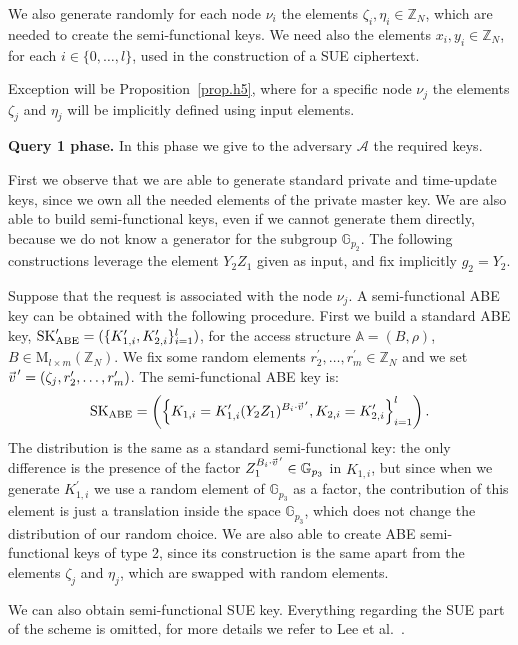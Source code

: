 \documentclass[a4paper,10pt]{article}
\newcommand{\G}{\mathbb{G}}
\newcommand{\Z}{\mathbb{Z}}
\newcommand{\varRow}{l}
\newcommand{\varColumn}{m}
\newcommand{\pvec}[2][]{{\hspace{-0.05em}\vec{\hspace{0.05em}#2}\mkern2mu\vphantom{#2}}^\prime_{\hspace{-0.18em}#1}}
\newcommand{\matrixset}[3]{\text{M}_{#1\times #2}(#3)}
\newcommand{\phase}[1]{\textbf{#1 phase.} \hspace{0pt}}
\begin{document}
	We also generate randomly for each node $\nu_i$ the elements $\zeta_i,\eta_i\in\Z_N$, which are needed to create the semi-functional keys. We need also the elements $x_i,y_i\in\Z_N$, for each $i\in\{0,\ldots,l\}$, used in the construction of a SUE ciphertext.
	
	Exception will be Proposition~\ref{prop.h5}, where for a specific node $\nu_j$ the elements $\zeta_j$ and $\eta_j$ will be implicitly defined using input elements.
	
	\phase{Query 1}
	In this phase we give to the adversary $\mathcal{A}$ the required keys.
	
	First we observe that we are able to generate standard private and time-update keys, since we own all the needed elements of the private master key. We are also able to build semi-functional keys, even if we cannot generate them directly, because we do not know a generator for the subgroup $\G_{p_2}$. The following con\-struc\-tions leverage the element $Y_2Z_1$ given as input, and fix implicitly $g_2=Y_2$. 
	
	Suppose that the request is associated with the node $\nu_j$.
	A semi-functional ABE key can be obtained with the following procedure. First we build a standard ABE key, $\mathrm{SK}^\prime_{\textnormal{ABE}}=(\{K^\prime_{1,i},K^\prime_{2,i}\}_{i=1}^{\varRow})$, for the access structure $\mathbb{A}=(B,\rho)$, $B\in\matrixset{\varRow}{\varColumn}{\Z_N}$.
	We fix some random elements $r^\prime_{2},\ldots,r^\prime_{\varColumn}\in \Z_N$ and we set $\pvec{v}=(\zeta_{j},r^\prime_{2},\ldots,r^\prime_{\varColumn})$. 
	The semi-functional ABE key is:
	\[
		\mathrm{SK}_{\textnormal{ABE}}=
		\left(\left\{
		K_{1,i}=K^\prime_{1,i}(Y_2Z_1)^{B_i\cdot \pvec{v}},
		K_{2,i}=K^\prime_{2,i}\right
		\}_{i=1}^{\varRow}\right).
	\]
	The distribution is the same as a standard semi-functional key: the only difference is the presence of the factor $Z_1^{B_i\cdot \pvec{v}}\in\G_{p_3}$ in $K_{1,i}$, but since when we generate $K^\prime_{1,i}$ we use a random element of $\G_{p_3}$ as a factor, the contribution of this element is just a translation inside the space $\G_{p_3}$, which does not change the distribution of our random choice.
	We are also able to create ABE semi-functional keys of type 2, since its construction is the same apart from the elements $\zeta_j$ and $\eta_j$, which are swapped with random elements.
	
	We can also obtain semi-functional SUE key. Everything regarding the SUE part of the scheme is omitted, for more details we refer to Lee et al.~\cite{lee2013RSABE}.
	
\end{document}

